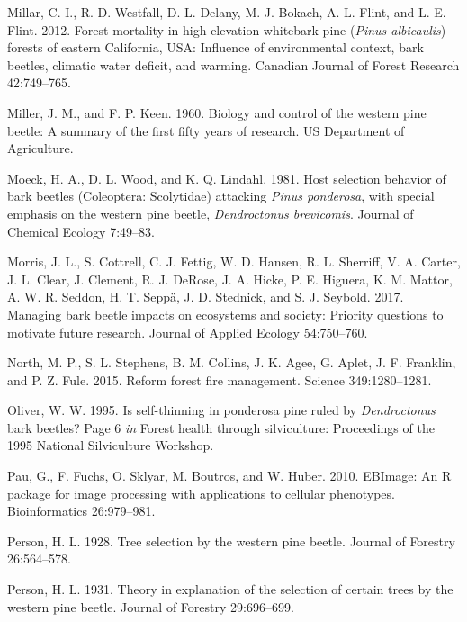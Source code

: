 \documentclass[]{article}
\begin{document}
\leavevmode\hypertarget{ref-millar2012}{}%
Millar, C. I., R. D. Westfall, D. L. Delany, M. J. Bokach, A. L. Flint,
and L. E. Flint. 2012. Forest mortality in high-elevation whitebark pine
(\emph{Pinus albicaulis}) forests of eastern California, USA: Influence
of environmental context, bark beetles, climatic water deficit, and
warming. Canadian Journal of Forest Research 42:749--765.

\leavevmode\hypertarget{ref-miller1960}{}%
Miller, J. M., and F. P. Keen. 1960. Biology and control of the western
pine beetle: A summary of the first fifty years of research. US
Department of Agriculture.

\leavevmode\hypertarget{ref-moeck1981}{}%
Moeck, H. A., D. L. Wood, and K. Q. Lindahl. 1981. Host selection
behavior of bark beetles (Coleoptera: Scolytidae) attacking \emph{Pinus
ponderosa}, with special emphasis on the western pine beetle,
\emph{Dendroctonus brevicomis}. Journal of Chemical Ecology 7:49--83.

\leavevmode\hypertarget{ref-morris2017}{}%
Morris, J. L., S. Cottrell, C. J. Fettig, W. D. Hansen, R. L. Sherriff,
V. A. Carter, J. L. Clear, J. Clement, R. J. DeRose, J. A. Hicke, P. E.
Higuera, K. M. Mattor, A. W. R. Seddon, H. T. Seppä, J. D. Stednick, and
S. J. Seybold. 2017. Managing bark beetle impacts on ecosystems and
society: Priority questions to motivate future research. Journal of
Applied Ecology 54:750--760.

\leavevmode\hypertarget{ref-north2015}{}%
North, M. P., S. L. Stephens, B. M. Collins, J. K. Agee, G. Aplet, J. F.
Franklin, and P. Z. Fule. 2015. Reform forest fire management. Science
349:1280--1281.

\leavevmode\hypertarget{ref-oliver1995}{}%
Oliver, W. W. 1995. Is self-thinning in ponderosa pine ruled by
\emph{Dendroctonus} bark beetles? Page 6 \emph{in} Forest health through
silviculture: Proceedings of the 1995 National Silviculture Workshop.

\leavevmode\hypertarget{ref-pau2010}{}%
Pau, G., F. Fuchs, O. Sklyar, M. Boutros, and W. Huber. 2010. EBImage:
An R package for image processing with applications to cellular
phenotypes. Bioinformatics 26:979--981.

\leavevmode\hypertarget{ref-person1928}{}%
Person, H. L. 1928. Tree selection by the western pine beetle. Journal
of Forestry 26:564--578.

\leavevmode\hypertarget{ref-person1931}{}%
Person, H. L. 1931. Theory in explanation of the selection of certain
trees by the western pine beetle. Journal of Forestry 29:696--699.
\end{document}
